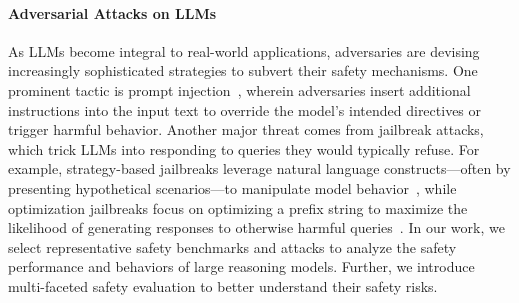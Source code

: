 \paragraph{Adversarial Attacks on LLMs} 
As LLMs become integral to real-world applications, adversaries are devising increasingly sophisticated strategies to subvert their safety mechanisms. 
One prominent tactic is prompt injection~\cite{yi2023benchmarking,zhan2024injecagent,zhang2024agent}, wherein adversaries insert additional instructions into the input text to override the model’s intended directives or trigger harmful behavior. 
Another major threat comes from jailbreak attacks, which trick LLMs into responding to queries they would typically refuse. For example, strategy-based jailbreaks leverage natural language constructs—often by presenting hypothetical scenarios—to manipulate model behavior~\cite{wei2024jailbroken,jiang2024wildteaming,zhu2024autodan,li2024llm,liu2024autodan}, while optimization jailbreaks focus on optimizing a prefix string to maximize the likelihood of generating responses to otherwise harmful queries~\cite{zou2023universal,liao2024amplegcg}.
In our work, we select representative safety benchmarks and attacks to analyze the safety performance and behaviors of large reasoning models. Further, we introduce multi-faceted safety evaluation to better understand their safety risks. 




